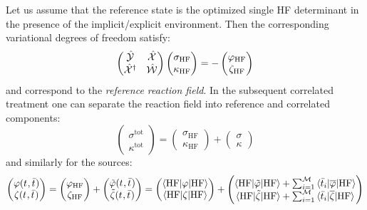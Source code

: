 Let us assume that the reference state is the optimized single \acs{HF}
determinant in the presence of the implicit/explicit environment.
Then the corresponding variational degrees of freedom satisfy:
\begin{equation}
  \begin{pmatrix}
    \hat{\mathcal{Y}} & \hat{\mathcal{X}} \\
    \hat{\mathcal{X}}^\dagger & \hat{\mathcal{W}}
  \end{pmatrix}
  \begin{pmatrix}
   \sigma_\mathrm{HF} \\
   \kappa_\mathrm{HF}
  \end{pmatrix}
  =
  -
  \begin{pmatrix}
   \varphi_\mathrm{HF} \\
   \zeta_\mathrm{HF}
  \end{pmatrix}
\end{equation}
and correspond to the \emph{reference reaction field}.
In the subsequent correlated treatment one can separate the reaction
field into reference and correlated components:
\begin{equation}
  \begin{pmatrix}
   \sigma^\mathrm{tot} \\
   \kappa^\mathrm{tot}
  \end{pmatrix}
  =
  \begin{pmatrix}
   \sigma_\mathrm{HF} \\
   \kappa_\mathrm{HF}
  \end{pmatrix}
  +
  \begin{pmatrix}
   \sigma \\
   \kappa
  \end{pmatrix}
\end{equation}
and similarly for the sources:
\begin{equation}
  \begin{pmatrix}
   \varphi(t_{}, \bar{t}_{}) \\
   \zeta(t_{}, \bar{t}_{})
  \end{pmatrix}
  =
  \begin{pmatrix}
   \varphi_\mathrm{HF} \\
   \zeta_\mathrm{HF}
  \end{pmatrix}
  +
  \begin{pmatrix}
    \tilde{\varphi}(t_{}, \bar{t}_{}) \\
   \tilde{\zeta}(t_{}, \bar{t}_{})
  \end{pmatrix}
  =
  \begin{pmatrix}
  \braket{\mathrm{HF} | \varphi  | \mathrm{HF}} \\
  \braket{\mathrm{HF} | \zeta | \mathrm{HF}}
  \end{pmatrix}
  +
  \begin{pmatrix}
   \braket{\mathrm{HF} | \tilde{\varphi} | \mathrm{HF}}
  + \sum_{i=1}^{\mathcal{M}}\braket{\bar{t}_{i} | \overline{\varphi} | \mathrm{HF}} \\
   \braket{\mathrm{HF} | \tilde{\zeta} | \mathrm{HF}}
  + \sum_{i=1}^{\mathcal{M}}\braket{\bar{t}_{i} | \overline{\zeta} | \mathrm{HF}}
  \end{pmatrix}
\end{equation}
